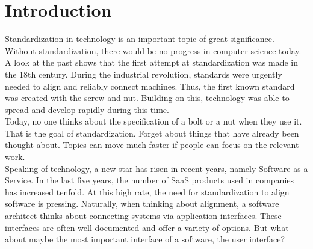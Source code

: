 \section{Introduction}
Standardization in technology is an important topic of great significance. Without standardization, there would be no progress in computer science today. \\
A look at the past shows that the first attempt at standardization was made in the 18th century. During the industrial revolution, standards were urgently needed to align and reliably connect machines. Thus, the first known standard was created with the screw and nut. Building on this, technology was able to spread and develop rapidly during this time. \cite{wiki_standardization_2022} \\
Today, no one thinks about the specification of a bolt or a nut when they use it. That is the goal of standardization. Forget about things that have already been thought about. Topics can move much faster if people can  focus on the relevant work. \\


Speaking of technology, a new star has risen in recent years, namely Software as a Service. In the last five years, the number of SaaS products used in companies has increased tenfold. \cite{stastista_saas_2021} At this high rate, the need for standardization to align software is pressing. Naturally, when thinking about alignment, a software architect thinks about connecting systems via application interfaces. These interfaces are often well documented and offer a variety of options. But what about maybe the most important interface of a software, the user interface?

%